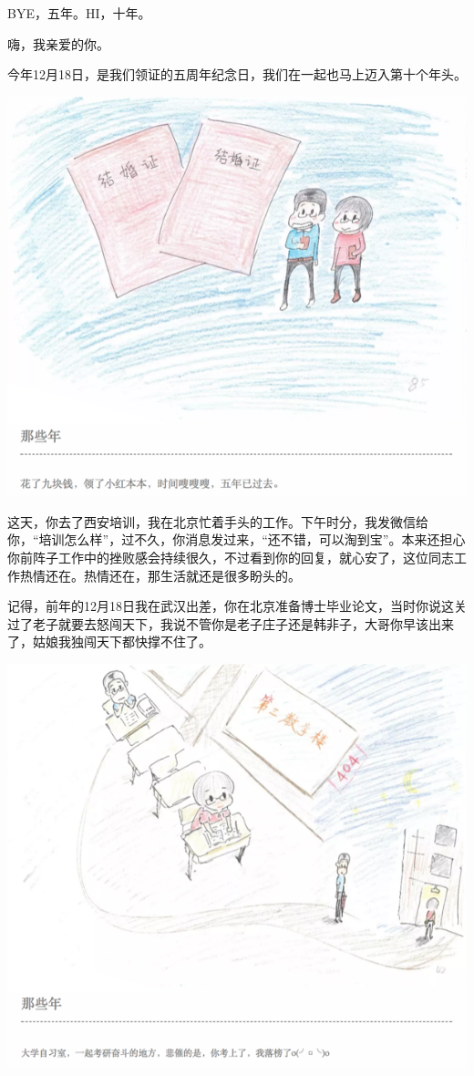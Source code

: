 \documentclass[]{book}
\begin{document}
BYE，五年。HI，十年。

嗨，我亲爱的你。

今年12月18日，是我们领证的五周年纪念日，我们在一起也马上迈入第十个年头。

\includegraphics[width=8.33in]{images/wife1}

这天，你去了西安培训，我在北京忙着手头的工作。下午时分，我发微信给你，``培训怎么样''，过不久，你消息发过来，``还不错，可以淘到宝''。本来还担心你前阵子工作中的挫败感会持续很久，不过看到你的回复，就心安了，这位同志工作热情还在。热情还在，那生活就还是很多盼头的。

记得，前年的12月18日我在武汉出差，你在北京准备博士毕业论文，当时你说这关过了老子就要去怒闯天下，我说不管你是老子庄子还是韩非子，大哥你早该出来了，姑娘我独闯天下都快撑不住了。

\includegraphics[width=8.33in]{images/wife2}
\end{document}
